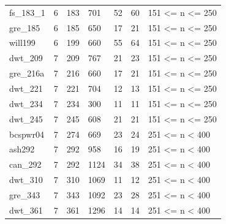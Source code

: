 \begin{tabular}{lllllll}
fs\_183\_1 & 6 & 183 & 701 & 52 & 60 & 151 <= n <= 250 \\
gre\_185 & 6 & 185 & 650 & 17 & 21 & 151 <= n <= 250 \\
will199 & 6 & 199 & 660 & 55 & 64 & 151 <= n <= 250 \\
dwt\_209 & 7 & 209 & 767 & 21 & 23 & 151 <= n <= 250 \\
gre\_216a & 7 & 216 & 660 & 17 & 21 & 151 <= n <= 250 \\
dwt\_221 & 7 & 221 & 704 & 12 & 13 & 151 <= n <= 250 \\
dwt\_234 & 7 & 234 & 300 & 11 & 11 & 151 <= n <= 250 \\
dwt\_245 & 7 & 245 & 608 & 21 & 21 & 151 <= n <= 250 \\
bcspwr04 & 7 & 274 & 669 & 23 & 24 & 251 <= n < 400 \\
ash292 & 7 & 292 & 958 & 16 & 19 & 251 <= n < 400 \\
can\_292 & 7 & 292 & 1124 & 34 & 38 & 251 <= n < 400 \\
dwt\_310 & 7 & 310 & 1069 & 11 & 12 & 251 <= n < 400 \\
gre\_343 & 7 & 343 & 1092 & 23 & 28 & 251 <= n < 400 \\
dwt\_361 & 7 & 361 & 1296 & 14 & 14 & 251 <= n < 400 \\
\hline
\end{tabular}
